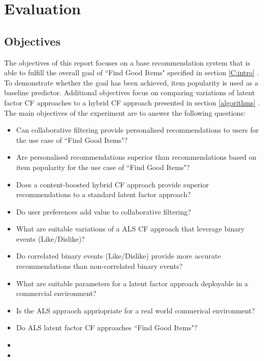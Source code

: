 \chapter{Evaluation}\label{C:evaluation}

\section{Objectives}

The objectives of this report focuses on a base recommendation system that is able to fulfill the overall goal of ``Find Good Items" specified in section \ref{C:intro} . To demonstrate whether the goal has been achieved, item popularity is used as a baseline predictor. Additional objectives focus on comparing variations of latent factor CF approaches to a hybrid CF approach presented in section \ref{algorithms} . The main objectives of the experiment are to answer the following questions:

\begin{itemize}
	\item{Can collaborative filtering provide personalised recommendations to users for the use case of ``Find Good Items"?}
	\item{Are personalised recommendations superior than recommendations based on item popularity for the use case of ``Find Good Items"?}
	\item{Does a content-boosted hybrid CF approach provide superior recommendations to a standard latent factor approach?}
	\item{Do user preferences add value to collaborative filtering?}
	\item{What are suitable variations of a ALS CF approach that leverage binary events (Like/Dislike)?}
	\item{Do correlated binary events (Like/Dislike) provide more accurate recommendations than non-correlated binary events?}
	\item{What are suitable parameters for a latent factor approach deployable in a commercial environment?}
	\item{Is the ALS appraoch appriopriate for a real world commerical environment?}
	\item{Do ALS latent factor CF approaches ``Find Good Items"?}
	\item{}
	\item{}
\end{itemize}

